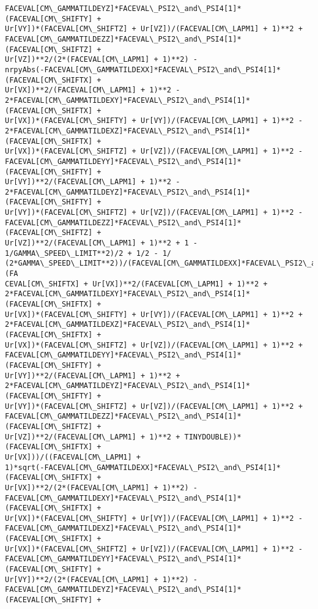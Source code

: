 \documentclass[landscape,letterpaper,10pt,english]{article}
\begin{document}
\begin{Verbatim}[commandchars=\\\{\}]
FACEVAL[CM\_GAMMATILDEYZ]*FACEVAL\_PSI2\_and\_PSI4[1]*(FACEVAL[CM\_SHIFTY] +
Ur[VY])*(FACEVAL[CM\_SHIFTZ] + Ur[VZ])/(FACEVAL[CM\_LAPM1] + 1)**2 +
FACEVAL[CM\_GAMMATILDEZZ]*FACEVAL\_PSI2\_and\_PSI4[1]*(FACEVAL[CM\_SHIFTZ] +
Ur[VZ])**2/(2*(FACEVAL[CM\_LAPM1] + 1)**2) -
nrpyAbs(-FACEVAL[CM\_GAMMATILDEXX]*FACEVAL\_PSI2\_and\_PSI4[1]*(FACEVAL[CM\_SHIFTX] +
Ur[VX])**2/(FACEVAL[CM\_LAPM1] + 1)**2 -
2*FACEVAL[CM\_GAMMATILDEXY]*FACEVAL\_PSI2\_and\_PSI4[1]*(FACEVAL[CM\_SHIFTX] +
Ur[VX])*(FACEVAL[CM\_SHIFTY] + Ur[VY])/(FACEVAL[CM\_LAPM1] + 1)**2 -
2*FACEVAL[CM\_GAMMATILDEXZ]*FACEVAL\_PSI2\_and\_PSI4[1]*(FACEVAL[CM\_SHIFTX] +
Ur[VX])*(FACEVAL[CM\_SHIFTZ] + Ur[VZ])/(FACEVAL[CM\_LAPM1] + 1)**2 -
FACEVAL[CM\_GAMMATILDEYY]*FACEVAL\_PSI2\_and\_PSI4[1]*(FACEVAL[CM\_SHIFTY] +
Ur[VY])**2/(FACEVAL[CM\_LAPM1] + 1)**2 -
2*FACEVAL[CM\_GAMMATILDEYZ]*FACEVAL\_PSI2\_and\_PSI4[1]*(FACEVAL[CM\_SHIFTY] +
Ur[VY])*(FACEVAL[CM\_SHIFTZ] + Ur[VZ])/(FACEVAL[CM\_LAPM1] + 1)**2 -
FACEVAL[CM\_GAMMATILDEZZ]*FACEVAL\_PSI2\_and\_PSI4[1]*(FACEVAL[CM\_SHIFTZ] +
Ur[VZ])**2/(FACEVAL[CM\_LAPM1] + 1)**2 + 1 - 1/GAMMA\_SPEED\_LIMIT**2)/2 + 1/2 - 1/
(2*GAMMA\_SPEED\_LIMIT**2))/(FACEVAL[CM\_GAMMATILDEXX]*FACEVAL\_PSI2\_and\_PSI4[1]*(FA
CEVAL[CM\_SHIFTX] + Ur[VX])**2/(FACEVAL[CM\_LAPM1] + 1)**2 +
2*FACEVAL[CM\_GAMMATILDEXY]*FACEVAL\_PSI2\_and\_PSI4[1]*(FACEVAL[CM\_SHIFTX] +
Ur[VX])*(FACEVAL[CM\_SHIFTY] + Ur[VY])/(FACEVAL[CM\_LAPM1] + 1)**2 +
2*FACEVAL[CM\_GAMMATILDEXZ]*FACEVAL\_PSI2\_and\_PSI4[1]*(FACEVAL[CM\_SHIFTX] +
Ur[VX])*(FACEVAL[CM\_SHIFTZ] + Ur[VZ])/(FACEVAL[CM\_LAPM1] + 1)**2 +
FACEVAL[CM\_GAMMATILDEYY]*FACEVAL\_PSI2\_and\_PSI4[1]*(FACEVAL[CM\_SHIFTY] +
Ur[VY])**2/(FACEVAL[CM\_LAPM1] + 1)**2 +
2*FACEVAL[CM\_GAMMATILDEYZ]*FACEVAL\_PSI2\_and\_PSI4[1]*(FACEVAL[CM\_SHIFTY] +
Ur[VY])*(FACEVAL[CM\_SHIFTZ] + Ur[VZ])/(FACEVAL[CM\_LAPM1] + 1)**2 +
FACEVAL[CM\_GAMMATILDEZZ]*FACEVAL\_PSI2\_and\_PSI4[1]*(FACEVAL[CM\_SHIFTZ] +
Ur[VZ])**2/(FACEVAL[CM\_LAPM1] + 1)**2 + TINYDOUBLE))*(FACEVAL[CM\_SHIFTX] +
Ur[VX]))/((FACEVAL[CM\_LAPM1] +
1)*sqrt(-FACEVAL[CM\_GAMMATILDEXX]*FACEVAL\_PSI2\_and\_PSI4[1]*(FACEVAL[CM\_SHIFTX] +
Ur[VX])**2/(2*(FACEVAL[CM\_LAPM1] + 1)**2) -
FACEVAL[CM\_GAMMATILDEXY]*FACEVAL\_PSI2\_and\_PSI4[1]*(FACEVAL[CM\_SHIFTX] +
Ur[VX])*(FACEVAL[CM\_SHIFTY] + Ur[VY])/(FACEVAL[CM\_LAPM1] + 1)**2 -
FACEVAL[CM\_GAMMATILDEXZ]*FACEVAL\_PSI2\_and\_PSI4[1]*(FACEVAL[CM\_SHIFTX] +
Ur[VX])*(FACEVAL[CM\_SHIFTZ] + Ur[VZ])/(FACEVAL[CM\_LAPM1] + 1)**2 -
FACEVAL[CM\_GAMMATILDEYY]*FACEVAL\_PSI2\_and\_PSI4[1]*(FACEVAL[CM\_SHIFTY] +
Ur[VY])**2/(2*(FACEVAL[CM\_LAPM1] + 1)**2) -
FACEVAL[CM\_GAMMATILDEYZ]*FACEVAL\_PSI2\_and\_PSI4[1]*(FACEVAL[CM\_SHIFTY] +

\end{Verbatim}
\end{document}
